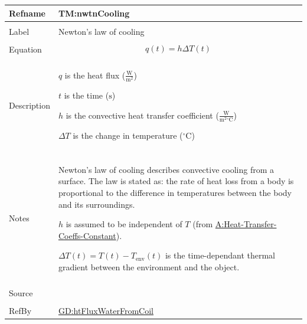 \documentclass[12pt]{article}
\begin{document}
\begin{minipage}{\textwidth}
\begin{tabular}{>{\raggedright}p{}>{\raggedright\arraybackslash}p{}}
\toprule \textbf{Refname} & \textbf{TM:nwtnCooling}
\label{TM:nwtnCooling}
\\ \midrule \\
Label & Newton's law of cooling
        
\\ \midrule \\
Equation & \begin{displaymath}
           q\left(t\right)=h ΔT\left(t\right)
           \end{displaymath}
\\ \midrule \\
Description & \begin{symbDescription}
              \item{$q$ is the heat flux ($\frac{\text{W}}{\text{m}^{2}}$)}
              \item{$t$ is the time (${\text{s}}$)}
              \item{$h$ is the convective heat transfer coefficient ($\frac{\text{W}}{\text{m}^{2}{}^{\circ}\text{C}}$)}
              \item{$ΔT$ is the change in temperature (${{}^{\circ}\text{C}}$)}
              \end{symbDescription}
\\ \midrule \\
Notes & Newton's law of cooling describes convective cooling from a surface. The law is stated as: the rate of heat loss from a body is proportional to the difference in temperatures between the body and its surroundings.
        
        $h$ is assumed to be independent of $T$ (from \hyperref[assumpHTCC]{A:Heat-Transfer-Coeffs-Constant}).
        
        $ΔT\left(t\right)=T\left(t\right)-{T_{\text{env}}}\left(t\right)$ is the time-dependant thermal gradient between the environment and the object.
        
\\ \midrule \\
Source & \cite[(pg. 8)]{incroperaEtAl2007}
         
\\ \midrule \\
RefBy & \hyperref[GD:htFluxWaterFromCoil]{GD:htFluxWaterFromCoil}
        
\\ \bottomrule
\end{tabular}
\end{minipage}
\end{document}
